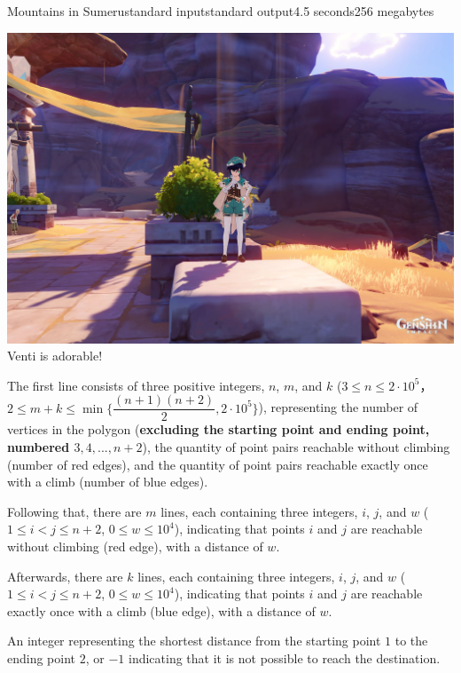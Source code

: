 \begin{problem}{Mountains in Sumeru}{standard input}{standard output}{4.5 seconds}{256 megabytes}
\begin{center}
    \includegraphics[scale=0.15]{venti.jpg} \\
    \small{Venti is adorable!}
\end{center}

\InputFile
The first line consists of three positive integers, $n$, $m$, and $k$ ($3 \le n \le 2 \cdot 10^5$，$2 \le m + k \le \min\{\dfrac{(n + 1)(n + 2)}{2}, 2 \cdot 10^5\}$), representing the number of vertices in the polygon (\textbf{excluding the starting point and ending point, numbered $3, 4, ..., n + 2$}), the quantity of point pairs reachable without climbing (number of red edges), and the quantity of point pairs reachable exactly once with a climb (number of blue edges).

Following that, there are $m$ lines, each containing three integers, $i$, $j$, and $w$ ($1 \le i < j \le n + 2$, $0 \le w \le 10^4$), indicating that points $i$ and $j$ are reachable without climbing (red edge), with a distance of $w$.

Afterwards, there are $k$ lines, each containing three integers, $i$, $j$, and $w$ ($1 \le i < j \le n + 2$, $0 \le w \le 10^4$), indicating that points $i$ and $j$ are reachable exactly once with a climb (blue edge), with a distance of $w$.

\OutputFile
An integer representing the shortest distance from the starting point $1$ to the ending point $2$, or $-1$ indicating that it is not possible to reach the destination.

\Examples

\begin{example}
%
%
%
\end{example}

\end{problem}

